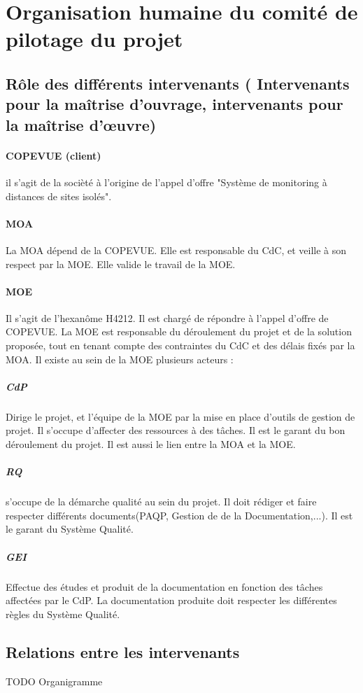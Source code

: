 \section{Organisation humaine du comité de pilotage du projet} 
  \subsection{Rôle des différents intervenants ( Intervenants pour la maîtrise d’ouvrage, intervenants pour la maîtrise d’œuvre)}
\paragraph{COPEVUE (client)}il s'agit de la socièté à l'origine de l'appel d'offre "Système de monitoring à distances de sites isolés".
\paragraph{MOA}La MOA dépend de la COPEVUE. Elle est responsable du CdC, et veille à son respect par la MOE. Elle valide le travail de la MOE.
\paragraph{MOE}Il s'agit de l'hexanôme H4212. Il est chargé de répondre à l'appel d'offre de COPEVUE. La MOE est responsable du déroulement du projet et de la solution proposée, tout en tenant compte des contraintes du CdC et des délais fixés par la MOA. Il existe au sein de la MOE plusieurs acteurs :

\subparagraph{CdP}Dirige le projet, et l'équipe de la MOE par la mise en place d'outils de gestion de projet. Il s'occupe d'affecter des ressources à des tâches. Il est le garant du bon déroulement du projet. Il est aussi le lien entre la MOA et la MOE.
\subparagraph{RQ}s'occupe de la démarche qualité au sein du projet. Il doit rédiger et faire respecter différents documents(PAQP, Gestion de de la Documentation,...). Il est le garant du Système Qualité.
\subparagraph{GEI}Effectue des études et produit de la documentation en fonction des tâches affectées par le CdP. La documentation produite doit respecter les différentes règles du Système Qualité.

  \subsection{Relations entre les intervenants}
  \begin{center} \begin{Large}TODO Organigramme\end{Large}  \end{center}
